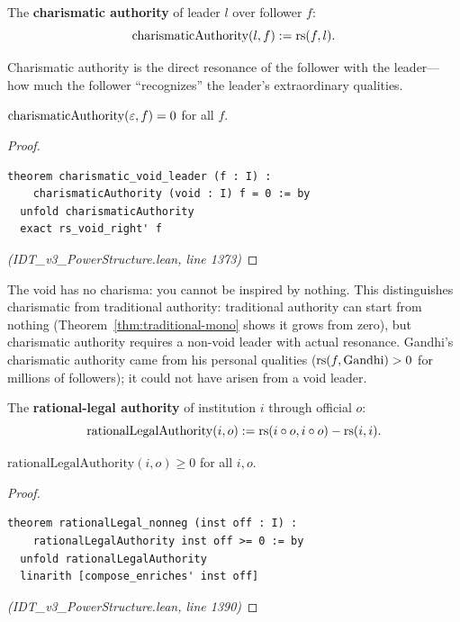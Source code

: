 \begin{definition}
\label{def:charismatic}
The \textbf{charismatic authority} of leader $l$ over follower $f$:
\[
  \mathrm{charismaticAuthority}(l, f) := \mathrm{rs}(f, l).
\]
\end{definition}

Charismatic authority is the direct resonance of the follower with the leader---
how much the follower ``recognizes'' the leader's extraordinary qualities.

\begin{theorem}
\label{thm:charisma-void}
$\mathrm{charismaticAuthority}(\varepsilon, f) = 0$ for all $f$.
\end{theorem}

\begin{proof}
\begin{lstlisting}
theorem charismatic_void_leader (f : I) :
    charismaticAuthority (void : I) f = 0 := by
  unfold charismaticAuthority
  exact rs_void_right' f
\end{lstlisting}
\textit{(IDT\_v3\_PowerStructure.lean, line 1373)}
\end{proof}

\begin{interpretation}
The void has no charisma: you cannot be inspired by nothing. This distinguishes
charismatic from traditional authority: traditional authority can start from
nothing (Theorem~\ref{thm:traditional-mono} shows it grows from zero), but
charismatic authority requires a non-void leader with actual resonance.
Gandhi's charismatic authority came from his personal qualities ($\mathrm{rs}(f, \text{Gandhi}) > 0$
for millions of followers); it could not have arisen from a void leader.
\end{interpretation}

\begin{definition}
\label{def:rational-legal}
The \textbf{rational-legal authority} of institution $i$ through official $o$:
\[
  \mathrm{rationalLegalAuthority}(i, o) := \mathrm{rs}(i \circ o, i \circ o) - \mathrm{rs}(i, i).
\]
\end{definition}

\begin{theorem}
\label{thm:rational-legal-nonneg}
$\mathrm{rationalLegalAuthority}(i, o) \geq 0$ for all $i, o$.
\end{theorem}

\begin{proof}
\begin{lstlisting}
theorem rationalLegal_nonneg (inst off : I) :
    rationalLegalAuthority inst off >= 0 := by
  unfold rationalLegalAuthority
  linarith [compose_enriches' inst off]
\end{lstlisting}
\textit{(IDT\_v3\_PowerStructure.lean, line 1390)}
\end{proof}

